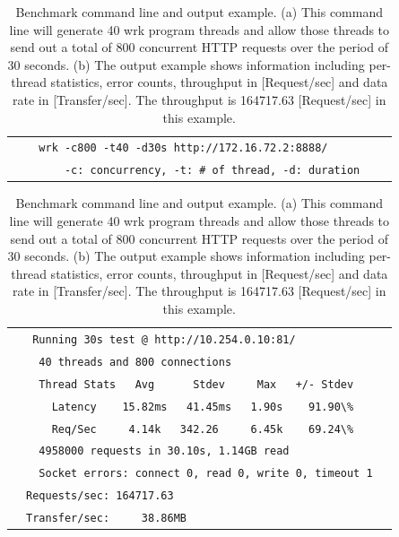 {
\renewcommand{\arraystretch}{1.1}

\begin{table}[h]

  \begin{subtable}{1\textwidth}
    \centering
    \begin{tabular}{lll}
      \hline
      &\verb|  wrk -c800 -t40 -d30s http://172.16.72.2:8888/       |& \\
      &\verb|      -c: concurrency, -t: # of thread, -d: duration  |& \\
      \hline
    \end{tabular}
    \centering\caption{Command line}
  \end{subtable}
 
\par\bigskip
 
  \begin{subtable}{1\textwidth}
    \centering
    \begin{tabular}{lll}
      \hline
      &\verb| Running 30s test @ http://10.254.0.10:81/            |& \\ 
      &\verb|  40 threads and 800 connections                      |& \\
      &\verb|  Thread Stats   Avg      Stdev     Max   +/- Stdev   |& \\
      &\verb|    Latency    15.82ms   41.45ms   1.90s    91.90\%   |& \\
      &\verb|    Req/Sec     4.14k   342.26     6.45k    69.24\%   |& \\
      &\verb|  4958000 requests in 30.10s, 1.14GB read             |& \\
      &\verb|  Socket errors: connect 0, read 0, write 0, timeout 1|& \\
      &\verb|Requests/sec: 164717.63                               |& \\
      &\verb|Transfer/sec:     38.86MB                             |& \\
      \hline
    \end{tabular}
    \centering\caption{Output example}
  \end{subtable}

  \centering
  \begin{minipage}{0.9\columnwidth}
    \caption[Benchmark command line and output example]{
      Benchmark command line and output example.
      (a) This command line will generate 40 wrk program threads and allow those threads to send out a total of 800 concurrent HTTP requests over the period of 30 seconds.
      (b) The output example shows information including per-thread statistics, error counts, throughput in [Request/sec] and data rate in [Transfer/sec].
      The throughput is 164717.63 [Request/sec] in this example.
    }
    \label{tab:bench_example}
  \end{minipage}
\end{table}
}

